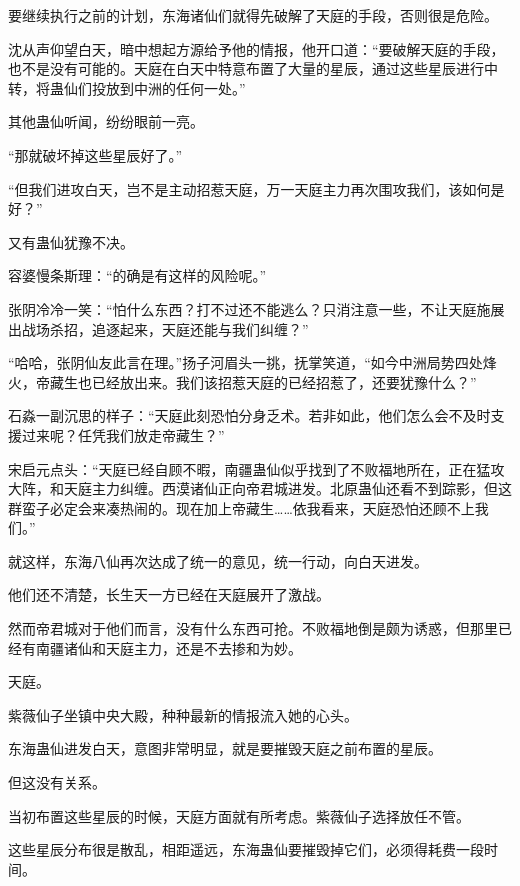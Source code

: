 
\begin{this_body}



要继续执行之前的计划，东海诸仙们就得先破解了天庭的手段，否则很是危险。

沈从声仰望白天，暗中想起方源给予他的情报，他开口道：“要破解天庭的手段，也不是没有可能的。天庭在白天中特意布置了大量的星辰，通过这些星辰进行中转，将蛊仙们投放到中洲的任何一处。”

其他蛊仙听闻，纷纷眼前一亮。

“那就破坏掉这些星辰好了。”

“但我们进攻白天，岂不是主动招惹天庭，万一天庭主力再次围攻我们，该如何是好？”

又有蛊仙犹豫不决。

容婆慢条斯理：“的确是有这样的风险呢。”

张阴冷冷一笑：“怕什么东西？打不过还不能逃么？只消注意一些，不让天庭施展出战场杀招，追逐起来，天庭还能与我们纠缠？”

“哈哈，张阴仙友此言在理。”扬子河眉头一挑，抚掌笑道，“如今中洲局势四处烽火，帝藏生也已经放出来。我们该招惹天庭的已经招惹了，还要犹豫什么？”

石淼一副沉思的样子：“天庭此刻恐怕分身乏术。若非如此，他们怎么会不及时支援过来呢？任凭我们放走帝藏生？”

宋启元点头：“天庭已经自顾不暇，南疆蛊仙似乎找到了不败福地所在，正在猛攻大阵，和天庭主力纠缠。西漠诸仙正向帝君城进发。北原蛊仙还看不到踪影，但这群蛮子必定会来凑热闹的。现在加上帝藏生……依我看来，天庭恐怕还顾不上我们。”

就这样，东海八仙再次达成了统一的意见，统一行动，向白天进发。

他们还不清楚，长生天一方已经在天庭展开了激战。

然而帝君城对于他们而言，没有什么东西可抢。不败福地倒是颇为诱惑，但那里已经有南疆诸仙和天庭主力，还是不去掺和为妙。

天庭。

紫薇仙子坐镇中央大殿，种种最新的情报流入她的心头。

东海蛊仙进发白天，意图非常明显，就是要摧毁天庭之前布置的星辰。

但这没有关系。

当初布置这些星辰的时候，天庭方面就有所考虑。紫薇仙子选择放任不管。

这些星辰分布很是散乱，相距遥远，东海蛊仙要摧毁掉它们，必须得耗费一段时间。


\end{this_body}
